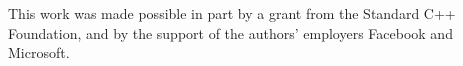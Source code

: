 \setcounter{chapter}{0}

This work was made possible in part by a grant from the Standard C++
Foundation, and by the support of the authors' employers Facebook and Microsoft.
